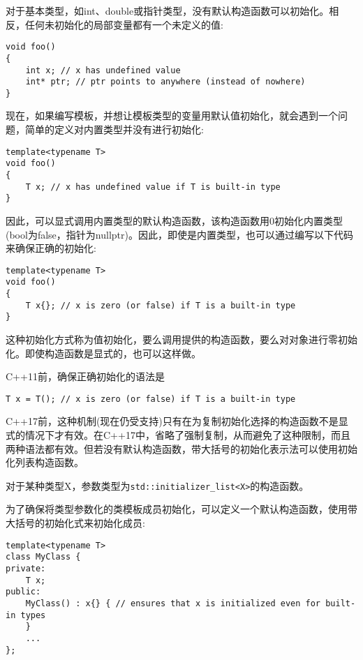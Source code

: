 对于基本类型，如int、double或指针类型，没有默认构造函数可以初始化。相反，任何未初始化的局部变量都有一个未定义的值:

\begin{lstlisting}[style=styleCXX]
void foo()
{
	int x; // x has undefined value
	int* ptr; // ptr points to anywhere (instead of nowhere)
}
\end{lstlisting}

现在，如果编写模板，并想让模板类型的变量用默认值初始化，就会遇到一个问题，简单的定义对内置类型并没有进行初始化:

\begin{lstlisting}[style=styleCXX]
template<typename T>
void foo()
{
	T x; // x has undefined value if T is built-in type
}
\end{lstlisting}

因此，可以显式调用内置类型的默认构造函数，该构造函数用0初始化内置类型(bool为false，指针为nullptr)。因此，即使是内置类型，也可以通过编写以下代码来确保正确的初始化:

\begin{lstlisting}[style=styleCXX]
template<typename T>
void foo()
{
	T x{}; // x is zero (or false) if T is a built-in type
}
\end{lstlisting}

这种初始化方式称为值初始化，要么调用提供的构造函数，要么对对象进行零初始化。即使构造函数是显式的，也可以这样做。

C++11前，确保正确初始化的语法是

\begin{lstlisting}[style=styleCXX]
T x = T(); // x is zero (or false) if T is a built-in type
\end{lstlisting}

C++17前，这种机制(现在仍受支持)只有在为复制初始化选择的构造函数不是显式的情况下才有效。在C++17中，省略了强制复制，从而避免了这种限制，而且两种语法都有效。但若没有默认构造函数，带大括号的初始化表示法可以使用初始化列表构造函数。

\begin{tcolorbox}[colback=webgreen!5!white,colframe=webgreen!75!black]
\hspace*{0.75cm}对于某种类型X，参数类型为\texttt{std::initializer\_list<X>}的构造函数。
\end{tcolorbox}

为了确保将类型参数化的类模板成员初始化，可以定义一个默认构造函数，使用带大括号的初始化式来初始化成员:

\begin{lstlisting}[style=styleCXX]
template<typename T>
class MyClass {
private:
	T x;
public:
	MyClass() : x{} { // ensures that x is initialized even for built-in types
	}
	...
};
\end{lstlisting}

